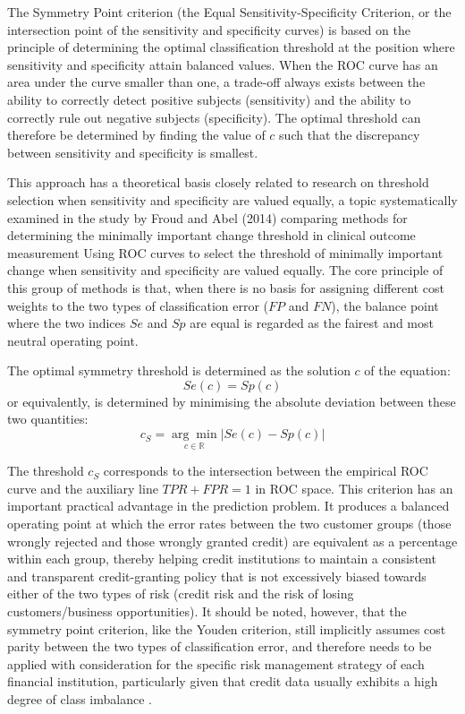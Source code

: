 \begin{enumerate}[label=\alph*)]
    The Symmetry Point criterion (the Equal Sensitivity-Specificity Criterion, or the intersection point of the sensitivity and specificity curves) is based on the principle of determining the optimal classification threshold at the position where sensitivity and specificity attain balanced values. When the ROC curve has an area under the curve smaller than one, a trade-off always exists between the ability to correctly detect positive subjects (sensitivity) and the ability to correctly rule out negative subjects (specificity). The optimal threshold can therefore be determined by finding the value of $c$ such that the discrepancy between sensitivity and specificity is smallest.

    \hspace{0.5cm} This approach has a theoretical basis closely related to research on threshold selection when sensitivity and specificity are valued equally, a topic systematically examined in the study by Froud and Abel (2014) \cite{froud2014using} comparing methods for determining the minimally important change threshold in clinical outcome measurement Using ROC curves to select the threshold of minimally important change when sensitivity and specificity are valued equally. The core principle of this group of methods is that, when there is no basis for assigning different cost weights to the two types of classification error ($FP$ and $FN$), the balance point where the two indices $Se$ and $Sp$ are equal is regarded as the fairest and most neutral operating point.

    \vspace{1em}
    \hspace{0.5cm} The optimal symmetry threshold is determined as the solution $c$ of the equation:
    $$Se(c) = Sp(c)$$
    or equivalently, is determined by minimising the absolute deviation between these two quantities:
    \begin{equation}
        c_{S} = \underset{c \in \mathbb{R}}{\arg\min} \big|Se(c) - Sp(c)\big|
    \end{equation}


    \hspace{0.5cm} The threshold $c_{S}$ corresponds to the intersection between the empirical ROC curve and the auxiliary line $TPR+FPR=1$ in ROC space. This criterion has an important practical advantage in the prediction problem. It produces a balanced operating point at which the error rates between the two customer groups (those wrongly rejected and those wrongly granted credit) are equivalent as a percentage within each group, thereby helping credit institutions to maintain a consistent and transparent credit-granting policy that is not excessively biased towards either of the two types of risk (credit risk and the risk of losing customers/business opportunities). It should be noted, however, that the symmetry point criterion, like the Youden criterion, still implicitly assumes cost parity between the two types of classification error, and therefore needs to be applied with consideration for the specific risk management strategy of each financial institution, particularly given that credit data usually exhibits a high degree of class imbalance \cite{chawla2002smote}.



\end{enumerate}
